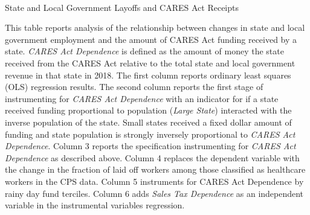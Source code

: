 \begin{landscape}

\begin{table}[!ht]
\begin{center}
\begin{threeparttable}
\caption{\\ State and Local Government Layoffs and CARES Act Receipts}
\label{table:layoffCARES}

\centering 

\begin{small}

	

\end{small}

\begin{footnotesize}
\begin{tablenotes}
\item This table reports analysis of the relationship between changes in state and local government employment and the amount of CARES Act funding received by a state. \emph{CARES Act Dependence} is defined as the amount of money the state received from the CARES Act relative to the total state and local government revenue in that state in 2018. The first column reports ordinary least squares (OLS) regression results. The second column reports the first stage of instrumenting for \emph{CARES Act Dependence} with an indicator for if a state received funding proportional to population (\emph{Large State}) interacted with the inverse population of the state. Small states received a fixed dollar amount of funding and state population is strongly inversely proportional to \emph{CARES Act Dependence}. Column 3 reports the specification instrumenting for \emph{CARES Act Dependence} as described above. Column 4 replaces the dependent variable with the change in the fraction of laid off workers among those classified as healthcare workers in the CPS data. Column 5 instruments for CARES Act Dependence by rainy day fund terciles.  Column 6 adds \emph{Sales Tax Dependence} as an independent variable in the instrumental variables regression.
\end{tablenotes}
\end{footnotesize}
\end{threeparttable}
\end{center}
\end{table}

\thispagestyle{empty}

\end{landscape}


